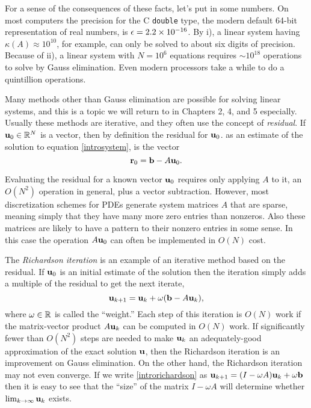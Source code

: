 For a sense of the consequences of these facts, let's put in some numbers.  On most computers the precision for the C \texttt{double} type, the modern default 64-bit representation of real numbers, is $\epsilon = 2.2 \times 10^{-16}$.  By i), a linear system having $\kappa(A) \approx 10^{10}$, for example, can only be solved to about six digits of precision.  Because of ii), a linear system with $N=10^6$ equations
requires $\sim 10^{18}$ operations to solve by Gauss elimination.  Even modern processors take a while to do a quintillion operations.

Many methods other than Gauss elimination are possible for solving linear systems, and this is a topic we will return to in Chapters 2, 4, and 5 especially.  Usually these methods are iterative, and they often use the concept of \emph{residual}.  If $\mathbf{u}_0\in \mathbb{R}^N$ is a vector, then by definition the residual for $\mathbf{u}_0$. as an estimate of the solution to equation \eqref{introsystem}, is the vector
\begin{equation}
\mathbf{r}_0 = \mathbf{b} - A \mathbf{u}_0. \label{residualdefn}
\end{equation}

Evaluating the residual for a known vector $\mathbf{u}_0$ requires only applying $A$ to it, an $O(N^2)$ operation in general, plus a vector subtraction.  However, most discretization schemes for PDEs generate system matrices $A$ that are sparse, meaning simply that they have many more zero entries than nonzeros.  Also these matrices are likely to have a pattern to their nonzero entries in some sense.  In this case the operation $A\mathbf{u}_0$ can often be implemented in $O(N)$ cost.

The \emph{Richardson iteration} is an example of an iterative method based on the residual.  If $\mathbf{u}_0$ is an initial estimate of the solution then the iteration simply adds a multiple of the residual to get the next iterate,
\begin{equation}
\mathbf{u}_{k+1} = \mathbf{u}_k + \omega (\mathbf{b} - A \mathbf{u}_k),  \label{introrichardson}
\end{equation}
where $\omega\in\mathbb{R}$ is called the ``weight.''  Each step of this iteration is $O(N)$ work if the matrix-vector product $A\mathbf{u}_k$ can be computed in $O(N)$ work.  If significantly fewer than $O(N^2)$ steps are needed to make $\mathbf{u}_k$ an adequately-good approximation of the exact solution $\mathbf{u}$, then the Richardson iteration is an improvement on Gauss elimination.  On the other hand, the Richardson iteration may not even converge.  If we write \eqref{introrichardson} as $\mathbf{u}_{k+1} = (I - \omega A) \mathbf{u}_k + \omega \mathbf{b}$ then it is easy to see that the ``size'' of the matrix $I-\omega A$ will determine whether $\lim_{k\to\infty} \mathbf{u}_k$ exists.

